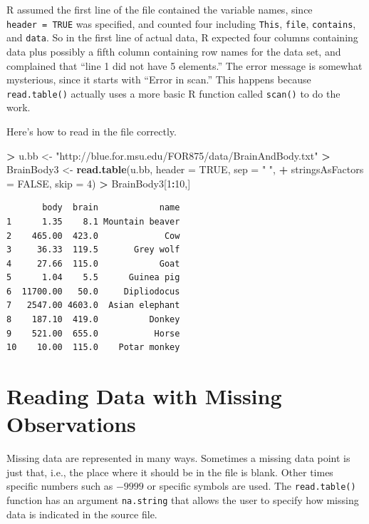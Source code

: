 \documentclass[]{krantz}
\makeatletter
\newenvironment{Shaded}{\begin{snugshade}}{\end{snugshade}}
\newcommand{\DataTypeTok}[1]{\textcolor[rgb]{0.27,0.27,0.27}{#1}}
\newcommand{\DecValTok}[1]{\textcolor[rgb]{0.06,0.06,0.06}{#1}}
\newcommand{\KeywordTok}[1]{\textcolor[rgb]{0.27,0.27,0.27}{\textbf{#1}}}
\newcommand{\NormalTok}[1]{#1}
\newcommand{\OperatorTok}[1]{\textcolor[rgb]{0.43,0.43,0.43}{\textbf{#1}}}
\newcommand{\OtherTok}[1]{\textcolor[rgb]{0.37,0.37,0.37}{#1}}
\newcommand{\StringTok}[1]{\textcolor[rgb]{0.5,0.5,0.5}{#1}}
\newenvironment{kframe}{%
\medskip{}
\setlength{\fboxsep}{.8em}
 \def\at@end@of@kframe{}%
 \ifinner\ifhmode%
  \def\at@end@of@kframe{\end{minipage}}%
  \begin{minipage}{\columnwidth}%
 \fi\fi%
 \def\FrameCommand##1{\hskip\@totalleftmargin \hskip-\fboxsep
 \colorbox{shadecolor}{##1}\hskip-\fboxsep
     \hskip-\linewidth \hskip-\@totalleftmargin \hskip\columnwidth}%
 \MakeFramed {\advance\hsize-\width
   \@totalleftmargin\z@ \linewidth\hsize
   \@setminipage}}%
 {\par\unskip\endMakeFramed%
 \at@end@of@kframe}
\renewenvironment{Shaded}{\begin{kframe}}{\end{kframe}}
\makeatother
\begin{document}
R assumed the first line of the file contained the variable names, since \texttt{header\ =\ TRUE} was specified, and counted four including \texttt{This}, \texttt{file}, \texttt{contains}, and \texttt{data}. So in the first line of actual data, R expected four columns containing data plus possibly a fifth column containing row names for the data set, and complained that ``line 1 did not have 5 elements.'' The error message is somewhat mysterious, since it starts with ``Error in scan.'' This happens because \texttt{read.table()} actually uses a more basic R function called \texttt{scan()} to do the work.

Here's how to read in the file correctly.

\begin{Shaded}
\begin{Highlighting}[]
\OperatorTok{>}\StringTok{ }\NormalTok{u.bb <-}\StringTok{ "http://blue.for.msu.edu/FOR875/data/BrainAndBody.txt"}
\OperatorTok{>}\StringTok{ }\NormalTok{BrainBody3 <-}\StringTok{ }\KeywordTok{read.table}\NormalTok{(u.bb, }\DataTypeTok{header =} \OtherTok{TRUE}\NormalTok{, }\DataTypeTok{sep =} \StringTok{" "}\NormalTok{, }
\OperatorTok{+}\StringTok{                          }\DataTypeTok{stringsAsFactors =} \OtherTok{FALSE}\NormalTok{, }\DataTypeTok{skip =} \DecValTok{4}\NormalTok{)}
\OperatorTok{>}\StringTok{ }\NormalTok{BrainBody3[}\DecValTok{1}\OperatorTok{:}\DecValTok{10}\NormalTok{,]}
\end{Highlighting}
\end{Shaded}

\begin{verbatim}
       body  brain            name
1      1.35    8.1 Mountain beaver
2    465.00  423.0             Cow
3     36.33  119.5       Grey wolf
4     27.66  115.0            Goat
5      1.04    5.5      Guinea pig
6  11700.00   50.0     Dipliodocus
7   2547.00 4603.0  Asian elephant
8    187.10  419.0          Donkey
9    521.00  655.0           Horse
10    10.00  115.0    Potar monkey
\end{verbatim}

\hypertarget{reading-data-with-missing-observations}{%
\section{Reading Data with Missing Observations}\label{reading-data-with-missing-observations}}

Missing data are represented in many ways. Sometimes a missing data point is just that, i.e., the place where it should be in the file is blank. Other times specific numbers such as \(-9999\) or specific symbols are used. The \texttt{read.table()} function has an argument \texttt{na.string} that allows the user to specify how missing data is indicated in the source file.
\end{document}
